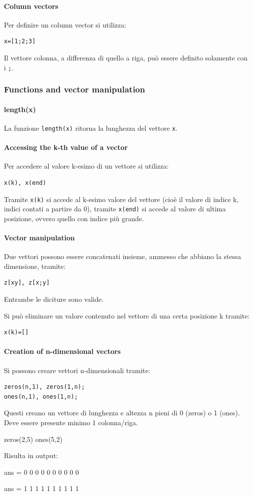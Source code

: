 \paragraph{Column vectors}
Per definire un column vector si utilizza:
\begin{verbatim}
x=[1;2;3]
\end{verbatim}
Il vettore colonna, a differenza di quello a riga, può essere definito solamente con i \verb|;|.

\subsubsection{Functions and vector manipulation}
\paragraph{length(x)}
La funzione \verb|length(x)| ritorna la lunghezza del vettore \verb|x|.
\paragraph{Accessing the k-th value of a vector}
Per accedere al valore k-esimo di un vettore si utilizza:
\begin{verbatim}
x(k), x(end)
\end{verbatim}
Tramite \verb|x(k)| si accede al k-esimo valore del vettore (cioè il valore di indice k, indici contati
a partire da 0), tramite \verb|x(end)| si accede al valore di ultima posizione, ovvero quello con indice più
grande.

\paragraph{Vector manipulation}
Due vettori possono essere concatenati insieme, ammesso che abbiano la stessa dimensione, tramite:
\begin{verbatim}
z[xy], z[x;y]
\end{verbatim}
Entrambe le diciture sono valide.

Si può eliminare un valore contenuto nel vettore di una certa posizione k tramite:
\begin{verbatim}
x(k)=[]
\end{verbatim}

\paragraph{Creation of n-dimensional vectors}
Si possono creare vettori n-dimensionali tramite:
\begin{verbatim}
zeros(n,1), zeros(1,n);
ones(n,1), ones(1,n);
\end{verbatim}
Questi creano un vettore di lunghezza e altezza n pieni di 0 (zeros) o 1 (ones).
Deve essere presente minimo 1 colonna/riga.
\begin{matlab}
    zeros(2,5)
    ones(5,2)
\end{matlab}
Risulta in output:
\begin{matlab}
    ans =
    0   0   0   0   0
    0   0   0   0   0

    ans =
    1   1
    1   1
    1   1
    1   1
    1   1
\end{matlab}

